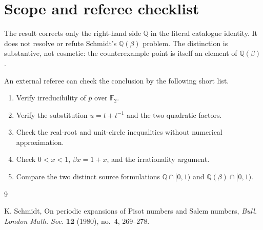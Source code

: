 \documentclass[10pt,reqno]{amsart}
\theoremstyle{definition}
\newcommand{\Q}{\mathbb Q}
\newcommand{\F}{\mathbb F}
\begin{document}
\section{Scope and referee checklist}

The result corrects only the right-hand side \(\Q\) in the literal catalogue
identity.  It does not resolve or refute Schmidt's \(\Q(\beta)\) problem.
The distinction is substantive, not cosmetic: the counterexample point is
itself an element of \(\Q(\beta)\).

An external referee can check the conclusion by the following short list.

\begin{enumerate}
\item Verify irreducibility of \(\overline p\) over \(\F_2\).
\item Verify the substitution \(u=t+t^{-1}\) and the two quadratic factors.
\item Check the real-root and unit-circle inequalities without numerical
  approximation.
\item Check \(0<x<1\), \(\beta x=1+x\), and the irrationality argument.
\item Compare the two distinct source formulations
  \(\Q\cap[0,1)\) and \(\Q(\beta)\cap[0,1)\).
\end{enumerate}

\begin{thebibliography}{9}

K. Schmidt,
On periodic expansions of Pisot numbers and Salem numbers,
\emph{Bull. London Math. Soc.} \textbf{12} (1980), no.~4, 269--278.

\end{thebibliography}
\end{document}
